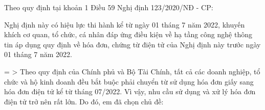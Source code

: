 Theo quy định tại khoản 1 Điều 59 Nghị định 123/2020/NĐ - CP:

Nghị định này có hiệu lực thi hành kể từ ngày 01 tháng 7 năm 2022, khuyến khích cơ quan, tổ chức, cá nhân đáp ứng điều kiện về hạ tầng công nghệ thông tin áp dụng quy định về hóa đơn, chứng từ điện tử của Nghị định này trước ngày 01 tháng 7 năm 2022.

= > Theo quy định của Chính phủ và Bộ Tài Chính, tất cả các doanh nghiệp, tổ chức và hộ kinh doanh đều bắt buộc phải chuyển từ sử dụng hóa đơn giấy sang hóa đơn điện tử kể từ tháng 07/2022. Vì vậy, nhu cầu sử dụng và xử lý hóa đơn điện tử trở nên rất lớn. Do đó, em đã chọn chủ đề:

